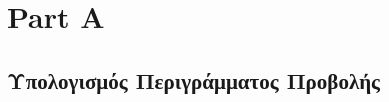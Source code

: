 \documentclass{report}
\begin{document}
\chapter{Part A}
\section{Υπολογισμός Περιγράμματος Προβολής}


\clearpage
{}
\end{document}
